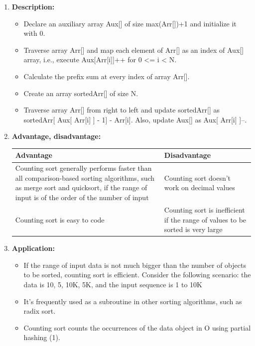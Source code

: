 \documentclass[11pt,a4paper]{article}
\begin{document}
{\begin{enumerate}[label=\textbf{\arabic*})]
				\item \textbf{Description:}
				\begin{itemize}
					\item 	Declare an auxiliary array Aux[] of size max(Arr[])+1 and initialize it with 0.
					\item Traverse array Arr[] and map each element of Arr[] as an index of Aux[] array, i.e., execute Aux[Arr[i]]++ for 0 <= i < N.  
					\item Calculate the prefix sum at every index of array Arr[]. 
					\item Create an array sortedArr[] of size N.
					\item Traverse array Arr[] from right to left and update sortedArr[] as sortedArr[ Aux[ Arr[i] ] - 1] - Arr[i]. Also, update Aux[] as  Aux[ Arr[i] ]--.
				\end{itemize}
				
				\item \textbf{Advantage, disadvantage:}
					\begin{table}[H]
						\centering
						\begin{tabular}{|p{8cm}|p{8cm}|}
							\hline
							\textbf{Advantage} & \textbf{Disadvantage} \\
							\hline
							\hline
							Counting sort generally performs faster than all comparison-based sorting algorithms, such as merge sort and quicksort, if the range of input is of the order of the number of input  & Counting sort doesn’t work on decimal values \\[12pt]
							Counting sort is easy to code & Counting sort is inefficient if the range of values to be sorted is very large \\
							\hline
						\end{tabular}
					\end{table}
				\item \textbf{Application:}	
					\begin{itemize}
						\item If the range of input data is not much bigger than the number of objects to be sorted, counting sort is efficient. Consider the following scenario: the data is 10, 5, 10K, 5K, and the input sequence is 1 to 10K
						\item It's frequently used as a subroutine in other sorting algorithms, such as radix sort.
						\item Counting sort counts the occurrences of the data object in O using partial hashing (1).
					\end{itemize}
			\end{enumerate}
			
}
\end{document}
